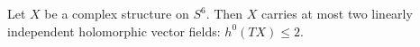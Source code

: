 \begin{cor}\label{Intro:Cor2}
Let $X$ be a complex structure on $S^{6}$. Then $X$ carries at most
two linearly independent holomorphic vector fields: $h^0(TX)\leq 2$.
\end{cor}
